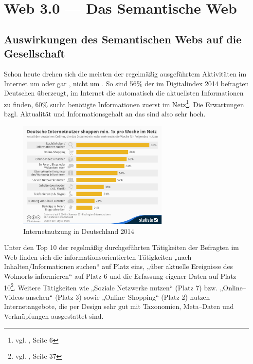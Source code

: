 \section{Web 3.0 --- Das Semantische Web}
\label{sec:hauptteil}

\subsection{Auswirkungen des Semantischen Webs auf die Gesellschaft}

Schon heute drehen sich die meisten der regelmäßig ausgeführtem Aktivitäten im Internet um  oder gar , nicht um . So sind 56\% der im Digitalindex 2014 befragten Deutschen überzeugt, im Internet die automatisch die aktuellsten Informationen zu finden, 60\% sucht benötigte Informationen zuerst im Netz\footnote{vgl. \cite{d21}, Seite 6}. Die Erwartungen bzgl. Aktualität und Informationsgehalt an das  sind also sehr hoch. 

\begin{figure}[H]
\begin{center}
\includegraphics[width=0.67\textwidth]{inetnutzung.jpg}
\caption[Internetnutzung in Deutschland 2014]{Internetnutzung in Deutschland 2014\protect\footnotemark}
\label{pic:inetnutzung}
\end{center}
\end{figure}

Unter den Top 10 der regelmäßig durchgeführten Tätigkeiten der Befragten im Web finden sich die informationsorientierten Tätigkeiten „nach Inhalten/Informationen suchen“ auf Platz eins, „über aktuelle Ereignisse des Wohnorts informieren“ auf Platz 6 und die Erfassung eigener Daten auf Platz 10\footnote{vgl. \cite{d21}, Seite 37}. Weitere Tätigkeiten wie „Soziale Netzwerke nutzen“ (Platz 7) bzw. „Online--Videos ansehen“ (Platz 3) sowie „Online--Shopping“ (Platz 2) nutzen Internetangebote, die per Design sehr gut mit Taxonomien, Meta--Daten und Verknüpfungen ausgestattet sind.

